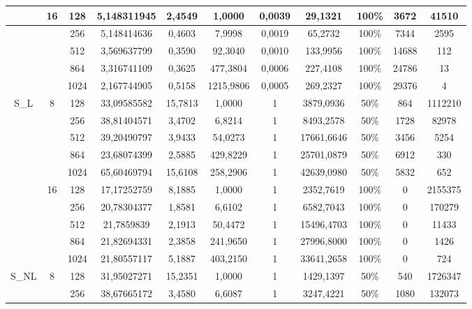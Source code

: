 \documentclass[10pt,a4paper]{article}
\begin{document}
\begin{center}
\begin{tabular}{ |c|c|c|c|c|c|c|c|c|c|c| }
		      & 16 & 128  & 5,148311945 & 2,4549  & 1,0000    & 0,0039 & 29,1321    & 100\% & 3672     & 41510   \\ \hline
		      &    & 256  & 5,148414636 & 0,4603  & 7,9998    & 0,0019 & 65,2732    & 100\% & 7344     & 2595    \\ \hline
		      &    & 512  & 3,569637799 & 0,3590  & 92,3040   & 0,0010 & 133,9956   & 100\% & 14688    & 112     \\ \hline
		      &    & 864  & 3,316741109 & 0,3625  & 477,3804  & 0,0006 & 227,4108   & 100\% & 24786    & 13      \\ \hline
		      &    & 1024 & 2,167744905 & 0,5158  & 1215,9806 & 0,0005 & 269,2327   & 100\% & 29376    & 4       \\ \hline
		S\_L   & 8  & 128  & 33,09585582 & 15,7813 & 1,0000    & 1      & 3879,0936  & 50\%  & 864      & 1112210 \\ \hline
		      &    & 256  & 38,81404571 & 3,4702  & 6,8214    & 1      & 8493,2578  & 50\%  & 1728     & 82978   \\ \hline
		      &    & 512  & 39,20490797 & 3,9433  & 54,0273   & 1      & 17661,6646 & 50\%  & 3456     & 5254    \\ \hline
		      &    & 864  & 23,68074399 & 2,5885  & 429,8229  & 1      & 25701,0879 & 50\%  & 6912     & 330     \\ \hline
		      &    & 1024 & 65,60469794 & 15,6108 & 258,2906  & 1      & 42639,0980 & 50\%  & 5832     & 652     \\ \hline
		      & 16 & 128  & 17,17252759 & 8,1885  & 1,0000    & 1      & 2352,7619  & 100\% & 0        & 2155375 \\ \hline
		      &    & 256  & 20,78304377 & 1,8581  & 6,6102    & 1      & 6582,7043  & 100\% & 0        & 170279  \\ \hline
		      &    & 512  & 21,7859839  & 2,1913  & 50,4472   & 1      & 15496,4703 & 100\% & 0        & 11433   \\ \hline
		      &    & 864  & 21,82694331 & 2,3858  & 241,9650  & 1      & 27996,8000 & 100\% & 0        & 1426    \\ \hline
		      &    & 1024 & 21,80557117 & 5,1887  & 403,2150  & 1      & 33641,2658 & 100\% & 0        & 724     \\ \hline
		S\_NL  & 8  & 128  & 31,95027271 & 15,2351 & 1,0000    & 1      & 1429,1397  & 50\%  & 540      & 1726347 \\ \hline
		      &    & 256  & 38,67665172 & 3,4580  & 6,6087    & 1      & 3247,4221  & 50\%  & 1080     & 132073  \\ \hline

\end{tabular}
\end{center}
\end{document}
